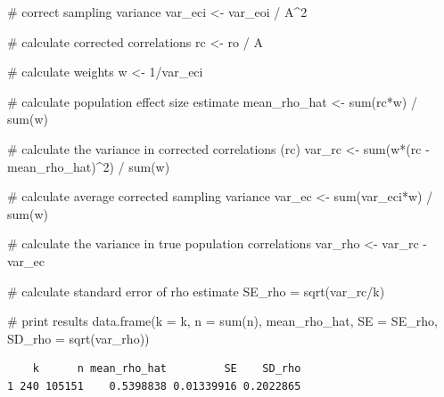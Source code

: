\documentclass[
  letterpaper,
  DIV=11,
  numbers=noendperiod]{scrreprt}
\newenvironment{Shaded}{\begin{snugshade}}{\end{snugshade}}
\newcommand{\AttributeTok}[1]{\textcolor[rgb]{0.40,0.45,0.13}{#1}}
\newcommand{\CommentTok}[1]{\textcolor[rgb]{0.37,0.37,0.37}{#1}}
\newcommand{\DecValTok}[1]{\textcolor[rgb]{0.68,0.00,0.00}{#1}}
\newcommand{\FunctionTok}[1]{\textcolor[rgb]{0.28,0.35,0.67}{#1}}
\newcommand{\NormalTok}[1]{\textcolor[rgb]{0.00,0.23,0.31}{#1}}
\newcommand{\OtherTok}[1]{\textcolor[rgb]{0.00,0.23,0.31}{#1}}
\newcommand{\SpecialCharTok}[1]{\textcolor[rgb]{0.37,0.37,0.37}{#1}}
\begin{document}
\begin{Shaded}
\begin{Highlighting}[]
\CommentTok{\# correct sampling variance}
\NormalTok{var\_eci }\OtherTok{\textless{}{-}}\NormalTok{ var\_eoi }\SpecialCharTok{/}\NormalTok{ A}\SpecialCharTok{\^{}}\DecValTok{2}

\CommentTok{\# calculate corrected correlations}
\NormalTok{rc }\OtherTok{\textless{}{-}}\NormalTok{ ro }\SpecialCharTok{/}\NormalTok{ A}

\CommentTok{\# calculate weights}
\NormalTok{w }\OtherTok{\textless{}{-}} \DecValTok{1}\SpecialCharTok{/}\NormalTok{var\_eci}

\CommentTok{\# calculate population effect size estimate}
\NormalTok{mean\_rho\_hat }\OtherTok{\textless{}{-}} \FunctionTok{sum}\NormalTok{(rc}\SpecialCharTok{*}\NormalTok{w) }\SpecialCharTok{/} \FunctionTok{sum}\NormalTok{(w)}

\CommentTok{\# calculate the variance in corrected correlations (rc)}
\NormalTok{var\_rc }\OtherTok{\textless{}{-}} \FunctionTok{sum}\NormalTok{(w}\SpecialCharTok{*}\NormalTok{(rc }\SpecialCharTok{{-}}\NormalTok{ mean\_rho\_hat)}\SpecialCharTok{\^{}}\DecValTok{2}\NormalTok{) }\SpecialCharTok{/} \FunctionTok{sum}\NormalTok{(w)}

\CommentTok{\# calculate average corrected sampling variance}
\NormalTok{var\_ec }\OtherTok{\textless{}{-}} \FunctionTok{sum}\NormalTok{(var\_eci}\SpecialCharTok{*}\NormalTok{w) }\SpecialCharTok{/} \FunctionTok{sum}\NormalTok{(w)}

\CommentTok{\# calculate the variance in true population correlations}
\NormalTok{var\_rho }\OtherTok{\textless{}{-}}\NormalTok{ var\_rc }\SpecialCharTok{{-}}\NormalTok{ var\_ec}

\CommentTok{\# calculate standard error of rho estimate}
\NormalTok{SE\_rho }\OtherTok{=} \FunctionTok{sqrt}\NormalTok{(var\_rc}\SpecialCharTok{/}\NormalTok{k)}

\CommentTok{\# print results}
\FunctionTok{data.frame}\NormalTok{(}\AttributeTok{k =}\NormalTok{ k,}
           \AttributeTok{n =} \FunctionTok{sum}\NormalTok{(n),}
\NormalTok{           mean\_rho\_hat,}
           \AttributeTok{SE =}\NormalTok{ SE\_rho,}
           \AttributeTok{SD\_rho =} \FunctionTok{sqrt}\NormalTok{(var\_rho))}
\end{Highlighting}
\end{Shaded}

\begin{verbatim}
    k      n mean_rho_hat         SE    SD_rho
1 240 105151    0.5398838 0.01339916 0.2022865
\end{verbatim}
\end{document}
